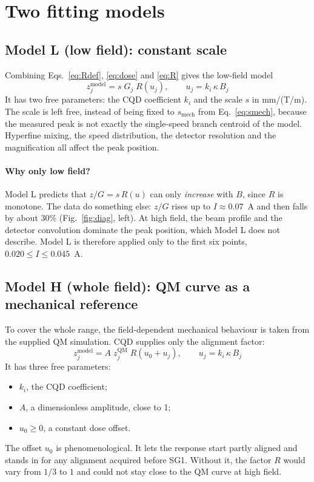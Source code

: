 \documentclass[11pt,a4paper]{article}
\newcommand{\QM}{\mathrm{QM}}
\begin{document}
\section{Two fitting models}

\subsection{Model L (low field): constant scale}
Combining Eqs.~\eqref{eq:Rdef}, \eqref{eq:dose} and \eqref{eq:R} gives the low-field model
\begin{equation}
\boxed{\;z_j^\text{model} = s\; G_j\; R(u_j), \qquad u_j = k_i\,\kappa\,B_j\;}
\label{eq:modelL}
\end{equation}
It has two free parameters: the CQD coefficient $k_i$ and the scale $s$ in mm/(T/m). The scale is left free, instead of being fixed to $s_\text{mech}$ from Eq.~\eqref{eq:smech}, because the measured peak is not exactly the single-speed branch centroid of the model. Hyperfine mixing, the speed distribution, the detector resolution and the magnification all affect the peak position.

\paragraph{Why only low field?} Model L predicts that $z/G = s\,R(u)$ can only \emph{increase} with $B$, since $R$ is monotone. The data do something else: $z/G$ rises up to $I\approx 0.07$~A and then falls by about 30\% (Fig.~\ref{fig:diag}, left). At high field, the beam profile and the detector convolution dominate the peak position, which Model L does not describe. Model L is therefore applied only to the first six points, $0.020\le I\le 0.045$~A.

\subsection{Model H (whole field): QM curve as a mechanical reference}
To cover the whole range, the field-dependent mechanical behaviour is taken from the supplied QM simulation. CQD supplies only the alignment factor:
\begin{equation}
\boxed{\;z_j^\text{model} = A\; z_j^{\QM}\; R(u_0 + u_j), \qquad u_j = k_i\,\kappa\,B_j\;}
\label{eq:modelH}
\end{equation}
It has three free parameters:
\begin{itemize}
\item $k_i$, the CQD coefficient;
\item $A$, a dimensionless amplitude, close to 1;
\item $u_0\ge 0$, a constant dose offset.
\end{itemize}
The offset $u_0$ is phenomenological. It lets the response start partly aligned and stands in for any alignment acquired before SG1. Without it, the factor $R$ would vary from $1/3$ to $1$ and could not stay close to the QM curve at high field.
\end{document}
